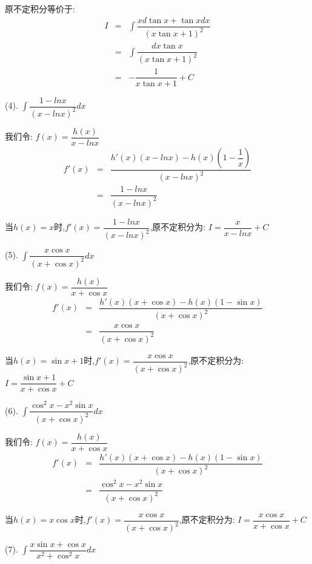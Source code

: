 \begin{anymark}[积分训练]
\begin{solution}
		原不定积分等价于:  
		\begin{eqnarray*}
			I&=&\int \dfrac{xd\tan x+\tan xdx}{(x\tan x+1)^2}\\
			&=&\int \dfrac{dx\tan x}{(x\tan x+1)^2}\\
			&=&-\dfrac{1}{x\tan x+1}+C
		\end{eqnarray*}
	\end{solution}
	(4). $\int \dfrac{1-ln x}{(x-ln x)^2}dx$
	\begin{solution}
		
		我们令:  $f(x)=\dfrac{h(x)}{x-ln x}$
		\begin{eqnarray*}
			f'(x)&=&\dfrac{h'(x)(x-lnx)-h(x)(1-\dfrac{1}{x})}{(x-ln x)^2}\\
			&=&\dfrac{1-ln x}{(x-ln x)^2}
		\end{eqnarray*}
	
	当$h(x)=x$时,$f'(x)=\dfrac{1-ln x}{(x-ln x)^2}$,原不定积分为:  $I=\dfrac{x}{x-ln x}+C$
	\end{solution}
	(5). $\int \dfrac{x\cos x}{(x+\cos x)^2}dx$
	\begin{solution}
		
		我们令:  $f(x)=\dfrac{h(x)}{x+\cos x}$
		\begin{eqnarray*}
			f'(x)&=&\dfrac{h'(x)(x+\cos x)-h(x)(1-\sin x)}{(x+\cos x)^2}\\
			&=&\dfrac{x\cos x}{(x+\cos x)^2}
		\end{eqnarray*}
		
		当$h(x)=\sin x+1$时,$f'(x)=\dfrac{x\cos x}{(x+\cos x)^2}$,原不定积分为:  $I=\dfrac{\sin x+1}{x+\cos x}+C$
	\end{solution}
	(6). $\int \dfrac{\cos^2x-x^2\sin x}{(x+\cos x)^2}dx$
	\begin{solution}
		
		我们令:  $f(x)=\dfrac{h(x)}{x+\cos x}$
		\begin{eqnarray*}
			f'(x)&=&\dfrac{h'(x)(x+\cos x)-h(x)(1-\sin x)}{(x+\cos x)^2}\\
			&=&\dfrac{\cos^2x-x^2\sin x}{(x+\cos x)^2}
		\end{eqnarray*}
		
		当$h(x)=x\cos x$时,$f'(x)=\dfrac{x\cos x}{(x+\cos x)^2}$,原不定积分为:  $I=\dfrac{x\cos x}{x+\cos x}+C$
	\end{solution}
	(7). $\int \dfrac{x\sin x+\cos x}{x^2+\cos^2x}dx$
	\begin{solution}
		

\end{solution}
\end{anymark}
